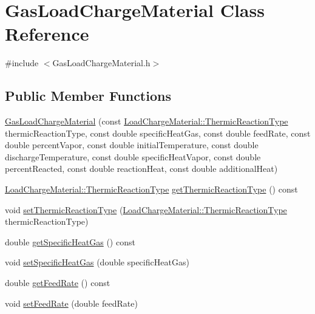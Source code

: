 \hypertarget{class_gas_load_charge_material}{}\section{Gas\+Load\+Charge\+Material Class Reference}
\label{class_gas_load_charge_material}


{\ttfamily \#include $<$Gas\+Load\+Charge\+Material.\+h$>$}

\subsection*{Public Member Functions}
\begin{DoxyCompactItemize}
\item 
\hyperlink{class_gas_load_charge_material_a4ad94a94d25bad9eaeca4947d879f35f}{Gas\+Load\+Charge\+Material} (const \hyperlink{class_load_charge_material_a51d4263e865a5d86236622dd3fe23fd1}{Load\+Charge\+Material\+::\+Thermic\+Reaction\+Type} thermic\+Reaction\+Type, const double specific\+Heat\+Gas, const double feed\+Rate, const double percent\+Vapor, const double initial\+Temperature, const double discharge\+Temperature, const double specific\+Heat\+Vapor, const double percent\+Reacted, const double reaction\+Heat, const double additional\+Heat)
\item 
\hyperlink{class_load_charge_material_a51d4263e865a5d86236622dd3fe23fd1}{Load\+Charge\+Material\+::\+Thermic\+Reaction\+Type} \hyperlink{class_gas_load_charge_material_ac801f30ccf58ce98fdb6b8cdb0a9767f}{get\+Thermic\+Reaction\+Type} () const
\item 
void \hyperlink{class_gas_load_charge_material_ac48eb07a3008f1dc0ff433353b59536d}{set\+Thermic\+Reaction\+Type} (\hyperlink{class_load_charge_material_a51d4263e865a5d86236622dd3fe23fd1}{Load\+Charge\+Material\+::\+Thermic\+Reaction\+Type} thermic\+Reaction\+Type)
\item 
double \hyperlink{class_gas_load_charge_material_a66e956e7a52b1032a3e8a725f26fa580}{get\+Specific\+Heat\+Gas} () const
\item 
void \hyperlink{class_gas_load_charge_material_a07bf6d4ee9161683fbeb3baad16ea7be}{set\+Specific\+Heat\+Gas} (double specific\+Heat\+Gas)
\item 
double \hyperlink{class_gas_load_charge_material_ae14ebe9b7091a491166174968505b6ee}{get\+Feed\+Rate} () const
\item 
void \hyperlink{class_gas_load_charge_material_a922b728dfd109d1c1684d7dfad82ec8e}{set\+Feed\+Rate} (double feed\+Rate)

\end{DoxyCompactItemize}
